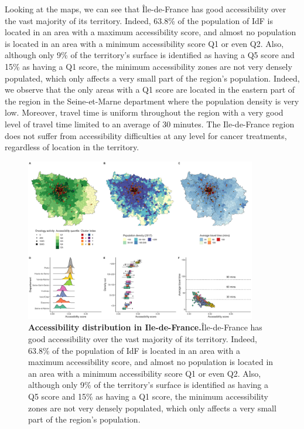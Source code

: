 Looking at the maps, we can see that Île-de-France has good accessibility over
the vast majority of its territory. Indeed, 63.8\% of the population of IdF is
located in an area with a maximum accessibility score, and almost no population
is located in an area with a minimum accessibility score Q1 or even Q2. Also,
although only 9\% of the territory's surface is identified as having a Q5 score
and 15\% as having a Q1 score, the minimum accessibility zones are not very
densely populated, which only affects a very small part of the region's
population. Indeed, we observe that the only areas with a Q1 score are located
in the eastern part of the region in the Seine-et-Marne department where the
population density is very low. Moreover, travel time is uniform throughout the
region with a very good level of travel time limited to an average of 30
minutes. The Ile-de-France region does not suffer from accessibility
difficulties at any level for cancer treatments, regardless of location in the
territory.

\begin{figure}[H]
    \includegraphics[width=0.9\textwidth]{images/camion/region_accessibility/accessibility_Ile-de-France.png}
    \centering
    \caption{
        \textbf{Accessibility distribution in Ile-de-France.}Île-de-France has good accessibility over the vast majority of its territory.
        Indeed, 63.8\% of the population of IdF is located in an area with a maximum
        accessibility score, and almost no population is located in an area with a
        minimum accessibility score Q1 or even Q2. Also, although only 9\% of the
        territory's surface is identified as having a Q5 score and 15\% as having a Q1
        score, the minimum accessibility zones are not very densely populated, which
        only affects a very small part of the region's population.
    }
\end{figure}


